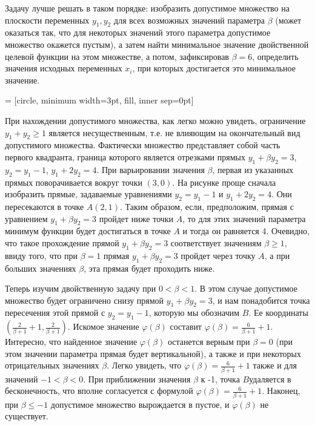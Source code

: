 \begin{solution}
Задачу лучше решать в таком порядке: изобразить допустимое множество на плоскости переменных $y_{1} ,y_{2} $ для всех возможных значений параметра $\beta $ (может оказаться так, что для некоторых значений этого параметра допустимое множество окажется пустым), а затем найти минимальное значение двойственной целевой функции на этом множестве, а потом, зафиксировав $\beta =6$, определить значения исходных переменных $x_{i} $, при которых достигается это минимальное значение.


 = [circle, minimum width=3pt, fill, inner sep=0pt]


При нахождении допустимого множества, как легко можно увидеть, ограничение $y_{1} +y_{2} \ge 1$ является несущественным, т.е. не влияющим на окончательный вид допустимого множества. Фактически множество представляет собой часть первого квадранта, граница которого является отрезками прямых $y_{1} +\beta y_{2} =3$, $y_{2} =y_{1} -1$, $y_{1} +2y_{2} =4$. При варьировании значения $\beta $, первая из указанных прямых поворачивается вокруг точки $(3,0)$. На рисунке проще сначала изобразить прямые, задаваемые уравнениями $y_{2} =y_{1} -1$ и $y_{1} +2y_{2} =4$. Они пересекаются в точке $A(2,1)$. Таким образом, если, предположим, прямая с уравнением  $y_{1} +\beta y_{2} =3$ пройдет ниже точки $A$, то для этих значений параметра минимум функции будет достигаться в точке $A$ и тогда он равняется 4. Очевидно, что такое прохождение прямой $y_{1} +\beta y_{2} =3$ соответствует значениям $\beta \ge 1$, ввиду того, что при $\beta =1$ прямая $y_{1} +\beta y_{2} =3$ пройдет через точку $A$, а при больших значениях $\beta $, эта прямая будет проходить ниже.

Теперь изучим двойственную задачу при $0<\beta <1$. В этом случае допустимое множество будет ограничено снизу прямой $y_{1} +\beta y_{2} =3$, и нам понадобится точка пересечения этой прямой с $y_{2} =y_{1} -1$, которую мы обозначим $B$. Ее координаты $\left(\frac{2}{\beta +1} +1,\frac{2}{\beta +1} \right)$. Искомое значение $\varphi (\beta )$ составит $\varphi (\beta )=\frac{6}{\beta +1} +1$. Интересно, что найденное значение $\varphi (\beta )$ останется верным при $\beta =0$ (при этом значении параметра прямая будет вертикальной), а также и при некоторых отрицательных значениях $\beta $. Легко увидеть, что $\varphi (\beta )=\frac{6}{\beta +1} +1$ также и для значений $-1<\beta <0$. При приближении значения $\beta $ к -1, точка $B$удаляется в бесконечность, что вполне согласуется с формулой $\varphi (\beta )=\frac{6}{\beta +1} +1$. Наконец, при $\beta \le -1$ допустимое множество вырождается в пустое, и $\varphi (\beta )$ не существует.


\end{solution}
